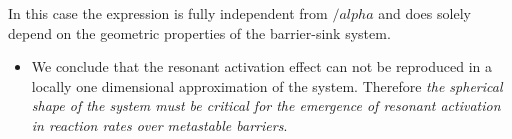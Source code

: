 In this case the expression is fully independent from $/alpha$ and does solely depend on the geometric properties of the barrier-sink system.
\par
\begin{itemize}
    \item We conclude that the resonant activation effect can not be reproduced in a locally one dimensional approximation of the system. Therefore \textit{the spherical shape of the system must be critical for the emergence of resonant activation in reaction rates over metastable barriers}.
\end{itemize}
